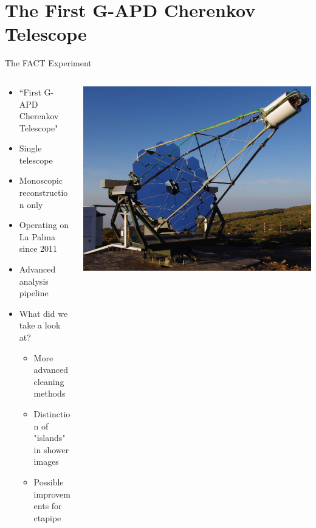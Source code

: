 \section{The First G-APD Cherenkov Telescope}

\begin{frame}{The FACT Experiment}
    \begin{columns}[T] %
        \begin{column}{.45\textwidth}
            \vspace{10pt}
            \begin{itemize}
                \item ``First G-APD Cherenkov Telescope"
                \item Single telescope
                \item[\rightarrow] Monoscopic reconstruction only
                \item Operating on La Palma since 2011
                \item[\rightarrow] Advanced analysis pipeline
                \item What did we take a look at?
                \begin{itemize}
                    \item{More advanced cleaning methods}
                    \item{Distinction of "islands" in shower images}
                    \item[\rightarrow] Possible improvements for ctapipe
                \end{itemize}
            \end{itemize}
        \end{column}
        \begin{column}{.48\textwidth}
            \includegraphics[width=\linewidth]{images/fact_telescope.jpg}
            \footnotesize{\cite{Anderhub_2013}}
        \end{column}
    \end{columns}
\end{frame}
